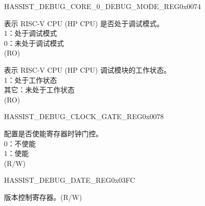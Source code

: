 \begin{register}{H}{ASSIST\_DEBUG\_CORE\_0\_DEBUG\_MODE\_REG}{0x0074}\label{regdesc:ASSISTDEBUGCORE0DEBUGMODEREG}
%
%
%
\regnewline%
\begin{regdesc}\begin{reglist}
\label{fielddesc:ASSISTDEBUGCORE0DEBUGMODE}\item [ASSIST\_DEBUG\_CORE\_0\_DEBUG\_MODE] 表示 RISC-V CPU (HP CPU) 是否处于调试模式。\\
1：处于调试模式\\
0：未处于调试模式\\
(RO)
\label{fielddesc:ASSISTDEBUGCORE0DEBUGMODULEACTIVE}\item [ASSIST\_DEBUG\_CORE\_0\_DEBUG\_MODULE\_ACTIVE] 表示 RISC-V CPU (HP CPU) 调试模块的工作状态。\\
1：处于工作状态\\
其它：未处于工作状态\\
(RO)
\end{reglist}\end{regdesc}
\end{register}


\begin{register}{H}{ASSIST\_DEBUG\_CLOCK\_GATE\_REG}{0x0078}\label{regdesc:ASSISTDEBUGCLOCKGATEREG}
%
%
\regnewline%
\begin{regdesc}\begin{reglist}
\label{fielddesc:ASSISTDEBUGCLKEN}\item [ASSIST\_DEBUG\_CLK\_EN]  配置是否使能寄存器时钟门控。\\
0：不使能\\
1：使能\\
(R/W)
\end{reglist}\end{regdesc}
\end{register}


\begin{register}{H}{ASSIST\_DEBUG\_DATE\_REG}{0x03FC}\label{regdesc:ASSISTDEBUGDATEREG}
%
%
\regnewline%
\begin{regdesc}\begin{reglist}
\label{fielddesc:ASSISTDEBUGDATE}\item [ASSIST\_DEBUG\_DATE] 版本控制寄存器。(R/W)
\end{reglist}\end{regdesc}
\end{register}
